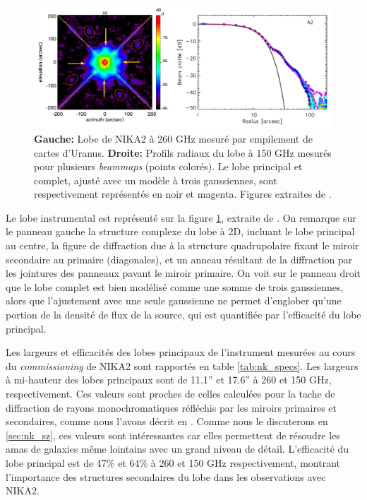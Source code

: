 \begin{figure}[t]
    \centering
    \includegraphics[page=2, width=.9\linewidth]{Figures/Chap_nk/beam.pdf}
    \caption[Lobe]{
        \textbf{Gauche:} Lobe de NIKA2 à 260 GHz mesuré par empilement de cartes d'Uranus.
        \textbf{Droite:} Profils radiaux du lobe à 150 GHz mesurés pour plusieurs \textit{beammaps} (points colorés).
        Le lobe principal et complet, ajusté avec un modèle à trois gaussiennes, sont respectivement représentés en noir et magenta.
        Figures extraites de \cite{perotto_calibration_2020}.
    }
    \label{fig:nk_beam}
\end{figure}

Le lobe instrumental est représenté sur la figure \ref{fig:nk_beam}, extraite de \cite{perotto_calibration_2020}.
On remarque sur le panneau gauche la structure complexe du lobe à 2D, incluant le lobe principal au centre, la figure de diffraction due à la structure quadrupolaire fixant le miroir secondaire au primaire (diagonales), et un anneau résultant de la diffraction par les jointures des panneaux pavant le miroir primaire.
On voit sur le panneau droit que le lobe complet est bien modélisé comme une somme de trois gaussiennes, alors que l'ajustement avec une seule gaussienne ne permet d'englober qu'une portion de la densité de flux de la source, qui est quantifiée par l'efficacité du lobe principal.

Les largeurs et efficacités des lobes principaux de l'instrument mesurées au cours du \textit{commissioning} de NIKA2 sont rapportés en table \ref{tab:nk_specs}.
Les largeurs à mi-hauteur des lobes principaux sont de 11.1'' et 17.6'' à 260 et 150 GHz, respectivement.
Ces valeurs sont proches de celles calculées pour la tache de diffraction de rayons monochromatiques réfléchis par les miroirs primaires et secondaires, comme nous l'avons décrit en .
Comme nous le discuterons en \ref{sec:nk_sz}, ces valeurs sont intéressantes car elles permettent de résoudre les amas de galaxies même lointains avec un grand niveau de détail.
L'efficacité du lobe principal est de 47\% et 64\% à 260 et 150 GHz respectivement, montrant l'importance des structures secondaires du lobe dans les observations avec NIKA2.


